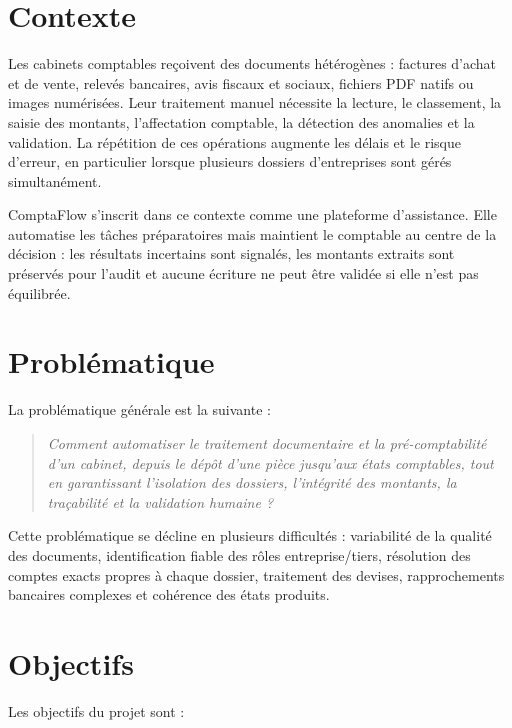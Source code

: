 \documentclass[12pt,a4paper,oneside]{report}
\begin{document}
\section{Contexte}

Les cabinets comptables reçoivent des documents hétérogènes : factures d'achat et de vente, relevés bancaires, avis fiscaux et sociaux, fichiers PDF natifs ou images numérisées. Leur traitement manuel nécessite la lecture, le classement, la saisie des montants, l'affectation comptable, la détection des anomalies et la validation. La répétition de ces opérations augmente les délais et le risque d'erreur, en particulier lorsque plusieurs dossiers d'entreprises sont gérés simultanément.

ComptaFlow s'inscrit dans ce contexte comme une plateforme d'assistance. Elle automatise les tâches préparatoires mais maintient le comptable au centre de la décision : les résultats incertains sont signalés, les montants extraits sont préservés pour l'audit et aucune écriture ne peut être validée si elle n'est pas équilibrée.

\section{Problématique}

La problématique générale est la suivante :

\begin{quote}
\textit{Comment automatiser le traitement documentaire et la pré-comptabilité d'un cabinet, depuis le dépôt d'une pièce jusqu'aux états comptables, tout en garantissant l'isolation des dossiers, l'intégrité des montants, la traçabilité et la validation humaine ?}
\end{quote}

Cette problématique se décline en plusieurs difficultés : variabilité de la qualité des documents, identification fiable des rôles entreprise/tiers, résolution des comptes exacts propres à chaque dossier, traitement des devises, rapprochements bancaires complexes et cohérence des états produits.

\section{Objectifs}

Les objectifs du projet sont :
\end{document}
